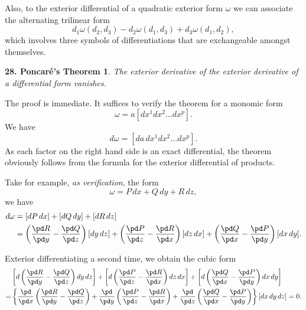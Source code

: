 Also, to the exterior differential of a quadratic exterior form $\omega$ we can associate  the alternating trilinear form
\[
d_{1}\omega(d_{2},d_{3})-d_{2}\omega(d_{1},d_{3})+d_{3}\omega(d_{1},d_{2}),
\]
which involves three symbols of differentiations that are exchangeable amongst themselves.

\vspace{12pt}\addtocounter{frenchsec}{1}
\theoremstyle{shape1}
\newtheorem*{thm28}{\hspace{15pt}\textbf{28.} Poncar\'e's Theorem}

\begin{thm28}
  The exterior derivative of the exterior derivative of a differential form vanishes.
\end{thm28}

The proof is immediate. It suffices to verify the theorem for a monomic form
\[
\omega=a[dx^{1}dx^{2}\dots dx^{p}].
\]
We have
\[
d\omega=[da\,dx^{1}dx^{2}\dots dx^{p}].
\]
As each factor on the right hand side is an exact differential, the theorem obviously follows from the formula for the exterior differential of products.

Take for example, \emph{as verification}, the form
\begin{equation}
  \label{eq:2.5}
  \omega=P\,dx+Q\,dy+R\,dz,
\end{equation}
we have
\begin{align}
  \label{eq:2.6}
  d\omega&=[dP\,dx]+[dQ\,dy]+[dR\,dz]\\
  &=\left(\frac{\pd R}{\pd y}-\frac{\pd Q}{\pd z}\right)[dy\,dz]+\left(\frac{\pd P}{\pd z}-\frac{\pd R}{\pd x}\right)[dz\,dx]+\left(\frac{\pd Q}{\pd x}-\frac{\pd P}{\pd y}\right)[dx\,dy].\notag
\end{align}

Exterior differentiating a second time, we obtain the cubic form
\begin{align*}
  &\left[d\left(\frac{\pd R}{\pd y}-\frac{\pd Q}{\pd z}\right)dy\,dz\right]+
  \left[d\left(\frac{\pd P}{\pd z}-\frac{\pd R}{\pd x}\right)dz\,dx\right]+
  \left[d\left(\frac{\pd Q}{\pd x}-\frac{\pd P}{\pd y}\right)dx\,dy\right]\\
=&\left\{
\frac{\pd}{\pd x}\left(\frac{\pd R}{\pd y}-\frac{\pd Q}{\pd z}\right)+
\frac{\pd}{\pd y}\left(\frac{\pd P}{\pd z}-\frac{\pd R}{\pd x}\right)+
\frac{\pd}{\pd z}\left(\frac{\pd Q}{\pd x}-\frac{\pd P}{\pd y}\right)\right\}[dx\,dy\,dz]=0.
\end{align*}


